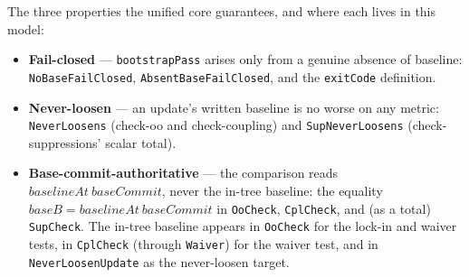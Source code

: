 \documentclass[a4paper,10pt,fleqn]{article}
\begin{document}
The three properties the unified core guarantees, and where each lives in
this model:

\begin{itemize}
\item \textbf{Fail-closed} --- \texttt{bootstrapPass} arises only from a
  genuine absence of baseline: \texttt{NoBaseFailClosed},
  \texttt{AbsentBaseFailClosed}, and the \texttt{exitCode} definition.
\item \textbf{Never-loosen} --- an update's written baseline is no worse on
  any metric: \texttt{NeverLoosens} (check-oo and check-coupling) and
  \texttt{SupNeverLoosens} (check-suppressions' scalar total).
\item \textbf{Base-commit-authoritative} --- the comparison reads
  $\mathit{baselineAt}~\mathit{baseCommit}$, never the in-tree baseline:
  the equality $baseB = baselineAt~baseCommit$ in \texttt{OoCheck},
  \texttt{CplCheck}, and (as a total) \texttt{SupCheck}. The in-tree
  baseline appears in \texttt{OoCheck} for the lock-in and waiver tests, in
  \texttt{CplCheck} (through \texttt{Waiver}) for the waiver test, and in
  \texttt{NeverLoosenUpdate} as the never-loosen target.
\end{itemize}
\end{document}
